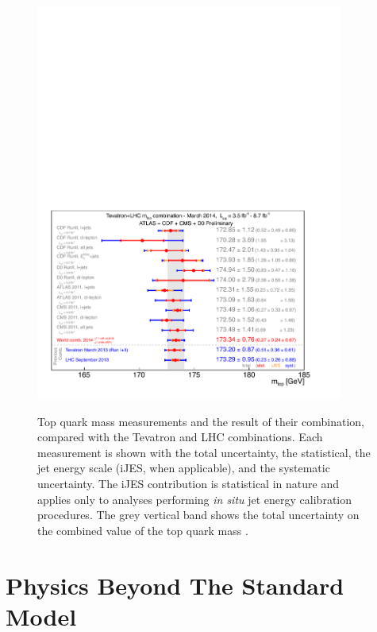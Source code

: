 \begin{figure}[hbtp]
   \centering
   {\includegraphics[width=0.9\textwidth]{top_world_combination}}
   \caption[World combination of the top quark mass measurements.]{Top quark mass measurements and the result of their
   combination, compared with the Tevatron and LHC combinations. Each measurement is shown with the total uncertainty,
   the statistical, the jet energy scale (iJES, when applicable), and the systematic uncertainty. The iJES contribution
   is statistical in nature and applies only to analyses performing \textit{in situ} jet energy calibration procedures.
   The grey vertical band shows the total uncertainty on the combined value of the top quark mass
   \autocite{world_top_mass_combination}.}
   \label{fig:top_mass_world_combination}
\end{figure}





\section{Physics Beyond The Standard Model}
\label{s:BSM}




